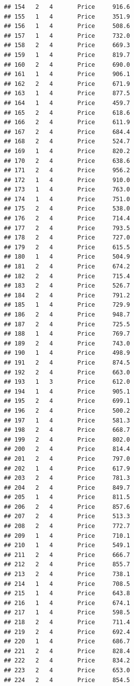 \documentclass[12pt,]{krantz}
\theoremstyle{definition}
\theoremstyle{definition}
\theoremstyle{remark}
\begin{document}
\begin{verbatim}
## 154   2   4       Price     916.6
## 155   1   4       Price     351.9
## 156   1   4       Price     508.6
## 157   1   4       Price     732.0
## 158   2   4       Price     669.3
## 159   1   4       Price     819.7
## 160   2   4       Price     690.0
## 161   1   4       Price     906.1
## 162   2   4       Price     671.9
## 163   1   4       Price     877.5
## 164   1   4       Price     459.7
## 165   2   4       Price     618.6
## 166   2   4       Price     611.9
## 167   2   4       Price     684.4
## 168   2   4       Price     524.7
## 169   1   4       Price     820.2
## 170   2   4       Price     638.6
## 171   2   4       Price     956.2
## 172   1   4       Price     910.0
## 173   1   4       Price     763.0
## 174   1   4       Price     751.0
## 175   2   4       Price     538.0
## 176   2   4       Price     714.4
## 177   2   4       Price     793.5
## 178   2   4       Price     727.0
## 179   2   4       Price     615.5
## 180   1   4       Price     504.9
## 181   2   4       Price     674.2
## 182   2   4       Price     715.4
## 183   2   4       Price     526.7
## 184   2   4       Price     791.2
## 185   1   4       Price     729.9
## 186   2   4       Price     948.7
## 187   2   4       Price     725.5
## 188   1   4       Price     769.7
## 189   2   4       Price     743.0
## 190   1   4       Price     498.9
## 191   2   4       Price     874.5
## 192   2   4       Price     663.0
## 193   1   3       Price     612.0
## 194   1   4       Price     905.1
## 195   2   4       Price     699.1
## 196   2   4       Price     500.2
## 197   1   4       Price     581.3
## 198   2   4       Price     668.7
## 199   2   4       Price     802.0
## 200   2   4       Price     814.4
## 201   2   4       Price     797.0
## 202   1   4       Price     617.9
## 203   2   4       Price     781.3
## 204   2   4       Price     849.7
## 205   1   4       Price     811.5
## 206   2   4       Price     857.6
## 207   2   4       Price     513.3
## 208   2   4       Price     772.7
## 209   1   4       Price     710.1
## 210   1   4       Price     549.1
## 211   2   4       Price     666.7
## 212   2   4       Price     855.7
## 213   2   4       Price     738.1
## 214   1   4       Price     708.5
## 215   1   4       Price     643.8
## 216   1   4       Price     674.1
## 217   1   4       Price     598.5
## 218   2   4       Price     711.4
## 219   2   4       Price     692.4
## 220   1   4       Price     686.7
## 221   2   4       Price     828.4
## 222   2   4       Price     834.2
## 223   2   4       Price     653.0
## 224   2   4       Price     854.5

\end{verbatim}
\end{document}

